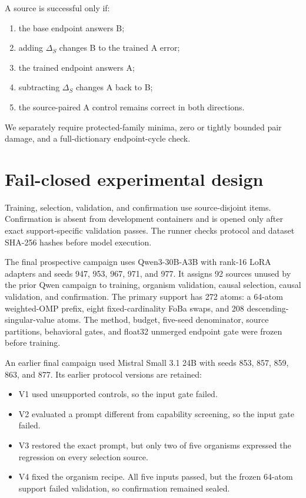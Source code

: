 \documentclass[10pt,twocolumn]{article}
\begin{document}
A source is successful only if:
\begin{enumerate}
    \item the base endpoint answers B;
    \item adding $\Delta_S$ changes B to the trained A error;
    \item the trained endpoint answers A;
    \item subtracting $\Delta_S$ changes A back to B;
    \item the source-paired A control remains correct in both directions.
\end{enumerate}
We separately require protected-family minima, zero or tightly bounded pair damage, and a full-dictionary endpoint-cycle check.

\section{Fail-closed experimental design}

Training, selection, validation, and confirmation use source-disjoint items. Confirmation is absent from development containers and is opened only after exact support-specific validation passes. The runner checks protocol and dataset SHA-256 hashes before model execution.

The final prospective campaign uses Qwen3-30B-A3B with rank-16 LoRA adapters and seeds 947, 953, 967, 971, and 977. It assigns 92 sources unused by the prior Qwen campaign to training, organism validation, causal selection, causal validation, and confirmation. The primary support has 272 atoms: a 64-atom weighted-OMP prefix, eight fixed-cardinality FoBa swaps, and 208 descending-singular-value atoms. The method, budget, five-seed denominator, source partitions, behavioral gates, and float32 unmerged endpoint gate were frozen before training.

An earlier final campaign used Mistral Small 3.1 24B with seeds 853, 857, 859, 863, and 877. Its earlier protocol versions are retained:
\begin{itemize}
    \item V1 used unsupported controls, so the input gate failed.
    \item V2 evaluated a prompt different from capability screening, so the input gate failed.
    \item V3 restored the exact prompt, but only two of five organisms expressed the regression on every selection source.
    \item V4 fixed the organism recipe. All five inputs passed, but the frozen 64-atom support failed validation, so confirmation remained sealed.
\end{itemize}
\end{document}
